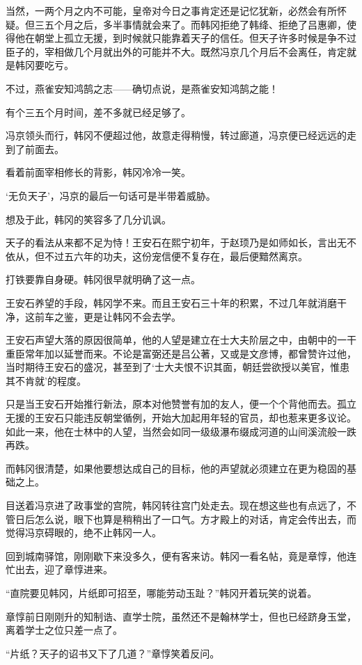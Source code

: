 当然，一两个月之内不可能，皇帝对今日之事肯定还是记忆犹新，必然会有所怀疑。但三五个月之后，多半事情就会来了。而韩冈拒绝了韩绛、拒绝了吕惠卿，使得他在朝堂上孤立无援，到时候就只能靠着天子的信任。但天子许多时候是争不过臣子的，宰相做几个月就出外的可能并不大。既然冯京几个月后不会离任，肯定就是韩冈要吃亏。

不过，燕雀安知鸿鹄之志——确切点说，是燕雀安知鸿鹄之能！

有个三五个月时间，差不多就已经足够了。

冯京领头而行，韩冈不便超过他，故意走得稍慢，转过廊道，冯京便已经远远的走到了前面去。

看着前面宰相修长的背影，韩冈冷冷一笑。

‘无负天子’，冯京的最后一句话可是半带着威胁。

想及于此，韩冈的笑容多了几分讥讽。

天子的看法从来都不足为恃！王安石在熙宁初年，于赵顼乃是如师如长，言出无不依从，但不过五六年的功夫，这份宠信便不复存在，最后便黯然离京。

打铁要靠自身硬。韩冈很早就明确了这一点。

王安石养望的手段，韩冈学不来。而且王安石三十年的积累，不过几年就消磨干净，这前车之鉴，更是让韩冈不会去学。

王安石声望大落的原因很简单，他的人望是建立在士大夫阶层之中，由朝中的一干重臣常年加以延誉而来。不论是富弼还是吕公著，又或是文彦博，都曾赞许过他，当时期待王安石的盛况，甚至到了‘士大夫恨不识其面，朝廷尝欲授以美官，惟患其不肯就’的程度。

只是当王安石开始推行新法，原本对他赞誉有加的友人，便一个个背他而去。孤立无援的王安石只能违反朝堂循例，开始大加起用年轻的官员，却也惹来更多议论。如此一来，他在士林中的人望，当然会如同一级级瀑布缀成河道的山间溪流般一跌再跌。

而韩冈很清楚，如果他要想达成自己的目标，他的声望就必须建立在更为稳固的基础之上。

目送着冯京进了政事堂的宫院，韩冈转往宫门处走去。现在想这些也有点远了，不管日后怎么说，眼下也算是稍稍出了一口气。方才殿上的对话，肯定会传出去，而觉得冯京碍眼的，绝不止韩冈一人。

回到城南驿馆，刚刚歇下来没多久，便有客来访。韩冈一看名帖，竟是章惇，他连忙出去，迎了章惇进来。

“直院要见韩冈，片纸即可招至，哪能劳动玉趾？”韩冈开着玩笑的说着。

章惇前日刚刚升的知制诰、直学士院，虽然还不是翰林学士，但也已经跻身玉堂，离着学士之位只差一点了。

“片纸？天子的诏书又下了几道？”章惇笑着反问。

